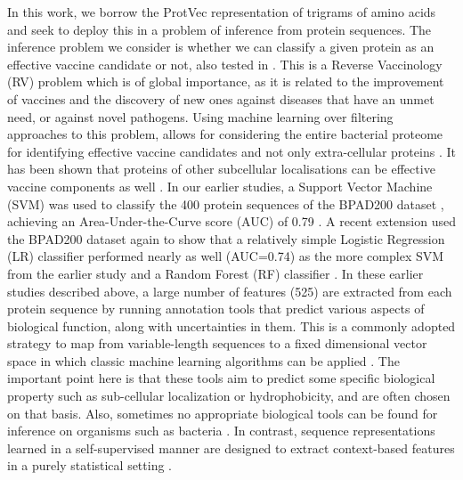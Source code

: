 \documentclass[10pt,journal,compsoc,twoside]{IEEEtran}
\begin{document}
In this work, we borrow the ProtVec representation of trigrams of amino acids and seek to deploy this in a problem of inference from protein sequences. The inference problem we consider is whether we can classify a given protein as an effective vaccine candidate or not, also tested in \cite{heinson_2017,heinson_2019,dalsass_2019}. This is a Reverse Vaccinology (RV) problem \cite{moxon_2019,vernikos_medini_2014} which is of global importance, as it is related to the improvement of vaccines and the discovery of new ones against diseases that have an unmet need, or against novel pathogens. Using machine learning over filtering approaches to this problem, allows for considering the entire bacterial proteome for identifying effective vaccine candidates and not only extra-cellular proteins \cite{vaxijen_2007,bowman_2011}. It has been shown that proteins of other subcellular localisations can be effective vaccine components as well \cite{nebenzahl_2007,fritzer_2010,henningham_2012}. In our earlier studies, a Support Vector Machine (SVM) was used to classify the 400 protein sequences of the BPAD200 dataset \cite{heinson_2017}, achieving an Area-Under-the-Curve score (AUC) of 0.79 \cite{heinson_2017}. A recent extension \cite{heinson_2019} used the BPAD200 dataset again to show that a relatively simple Logistic Regression (LR) classifier performed nearly as well (AUC=0.74) as the more complex SVM from the earlier study \cite{heinson_2017} and a Random Forest (RF) classifier \cite{heinson_2019}. In these earlier studies \cite{heinson_2017,heinson_2019} described above, a large number of features (525) are extracted from each protein sequence by running annotation tools that predict various aspects of biological function, along with uncertainties in them. This is a commonly adopted strategy to map from variable-length sequences to a fixed dimensional vector space in which classic machine learning algorithms can be applied \cite{dalsass_2019}. The important point here is that these tools aim to predict some specific biological property such as sub-cellular localization or hydrophobicity, and are often chosen on that basis. Also, sometimes no appropriate biological tools can be found for inference on organisms such as bacteria \cite{heinson_2019}. In contrast, sequence representations learned in a self-supervised manner are designed to extract context-based features in a purely statistical setting \cite{protvec}.  
\end{document}
